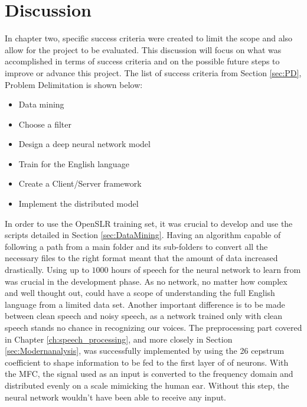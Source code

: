 \chapter{Discussion}\label{ch:discussion}

In chapter two, specific success criteria were created to limit the scope and also allow for the project to be evaluated. This discussion will focus on what was accomplished in terms of success criteria and on the possible future steps to improve or advance this project. The list of success criteria from Section \ref{sec:PD}, Problem Delimitation is shown below:

\begin{itemize}
	\item Data mining
	\item Choose a filter
	\item Design a deep neural network model
	\item Train for the English language
	\item Create a Client/Server framework
	\item Implement the distributed model
\end{itemize} 

In order to use the OpenSLR training set, it was crucial to develop and use the 
scripts detailed in Section \ref{sec:DataMining}.
 Having an algorithm capable of following a path from a main folder and its sub-folders to convert all the necessary files to the right format meant that the 
 amount of data increased drastically.
  Using up to $1000$ hours of speech for the neural network to learn from was 
  crucial in the development phase. 
  As no network, no matter how complex and well thought out, could have a scope of 
  understanding the full English language from a limited data set. 
  Another important difference is to be made between clean speech and noisy speech, 
  as a network trained only with clean speech stands no chance in recognizing our 
  voices. 
  The preprocessing part covered in Chapter \ref{ch:speech_processing}, and more
   closely in Section \ref{sec:Modernanalysis}, was  successfully implemented by 
   using the 26 cepstrum coefficient to shape information to be fed to the first 
   layer of of neurons. With the MFC, the signal used as an input is converted to the frequency
   domain and distributed evenly on a scale mimicking the human ear. Without this step, the neural
   network wouldn't have been able to receive any input.\\
   
